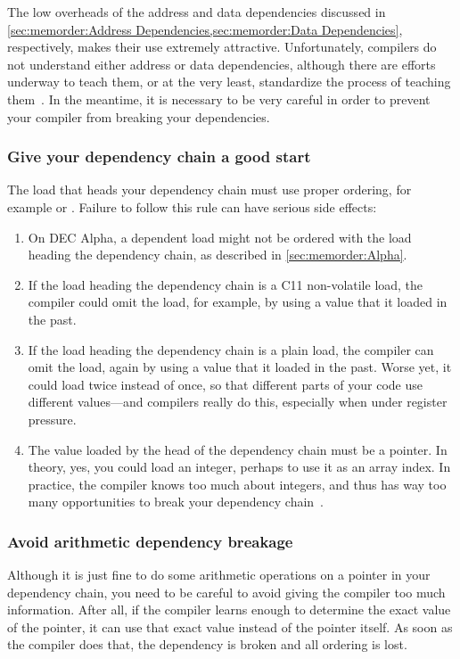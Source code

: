 The low overheads of the address and data dependencies discussed in
\cref{sec:memorder:Address Dependencies,sec:memorder:Data Dependencies},
respectively, makes their use extremely attractive.
Unfortunately, compilers do not understand either address or data
dependencies, although there are efforts underway to teach them, or at
the very least, standardize the process of teaching
them~\cite{PaulEMcKennneyConsumeP0190R4,PaulEMcKenney2017markconsumeP0462R1}.
In the meantime, it is necessary to be very careful in order to prevent
your compiler from breaking your dependencies.

\subsubsection{Give your dependency chain a good start}
The load that heads your dependency chain must use proper
ordering, for example  or .
Failure to follow this rule can have serious side effects:

\begin{enumerate}
\item	On DEC Alpha, a dependent load might not be ordered with
	the load heading the dependency chain, as described in
	\cref{sec:memorder:Alpha}.
\item	If the load heading the dependency chain is a
	C11 non-volatile  load,
	the compiler could omit the load, for example, by using a value
	that it loaded in the past.
\item	If the load heading the dependency chain is a plain load,
	the compiler can omit the load, again by using a value
	that it loaded in the past.
	Worse yet, it could load twice instead of once, so that
	different parts of your code use different values---and
	compilers really do this, especially when under register
	pressure.
\item	The value loaded by the head of the dependency chain must
	be a pointer.
	In theory, yes, you could load an integer, perhaps to use
	it as an array index.
	In practice, the compiler knows too much about integers,
	and thus has way too many opportunities to break your
	dependency chain~\cite{PaulEMcKennneyConsumeP0190R4}.
\end{enumerate}

\subsubsection{Avoid arithmetic dependency breakage}
Although it is just fine to do some arithmetic operations on a pointer in
your dependency chain, you need to be careful to avoid giving the
compiler too much information.
After all, if the compiler learns enough to determine the exact value
of the pointer, it can use that exact value instead of the pointer itself.
As soon as the compiler does that, the dependency is broken and all
ordering is lost.

